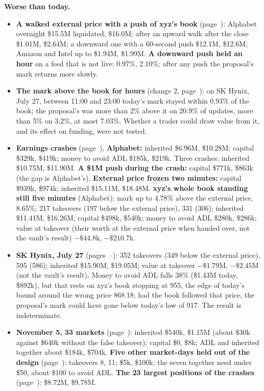 {\textbf{Worse than today.}
\begin{itemize}[leftmargin=1.3em,itemsep=0pt,topsep=0pt,parsep=0pt]
\item \textbf{A walked external price with a push of xyz's book} (page~\pageref{sec:attacks}): Alphabet overnight \$15.5M liquidated, \$16.0M; after an upward walk after the close \$1.01M, \$2.64M; a downward one with a 60-second push \$12.1M, \$12.6M; Amazon and Intel up to \$1.94M, \$1.99M. \textbf{A downward push held an hour} on a feed that is not live: 0.97\%, 2.10\%; after any push the proposal's mark returns more slowly.
\item \textbf{The mark above the book for hours} (change 2, page~\pageref{sec:skhx}): on SK Hynix, July 27, between 11:00 and 23:00 today's mark stayed within 0.93\% of the book; the proposal's was more than 2\% above it on 20.9\% of updates, more than 5\% on 3.2\%, at most 7.03\%. Whether a trader could draw value from it, and its effect on funding, were not tested.
\item \textbf{Earnings crashes} (page~\pageref{sec:res-mark}), \textbf{Alphabet:} inherited \$6.96M, \$10.28M; capital \$329k, \$419k; money to avoid ADL \$185k, \$219k. Three crashes: inherited \$10.75M, \$11.90M. \textbf{A \$1M push during the crash:} capital \$771k, \$863k (the gap is Alphabet's). \textbf{External price frozen two minutes:} capital \$939k, \$974k; inherited \$15.11M, \$18.48M. \textbf{xyz's whole book standing still five minutes} (Alphabet): mark up to 4.78\% above the external price, 8.65\%; 217 takeovers (197 below the external price), 331 (306); inherited \$11.41M, \$16.26M; capital \$498k, \$540k; money to avoid ADL \$280k, \$286k; value at takeover (their worth at the external price when handed over, not the vault's result) $-\$44.8$k, $-\$210.7$k.
\item \textbf{SK Hynix, July 27} (pages~\pageref{sec:skhx}--\pageref{sec:skhx2}): 352 takeovers (349 below the external price), 595 (586); inherited \$15.90M, \$19.05M; value at takeover $-\$1.79$M, $-\$2.45$M (not the vault's result). Money to avoid ADL falls 38\% (\$1.43M today, \$892k), but that rests on xyz's book stopping at 955, the edge of today's bound around the wrong price 868.18; had the book followed that price, the proposal's mark could have gone below today's low of 917. The result is indeterminate.
\item \textbf{November 5, 33 markets} (page~\pageref{sec:users}): inherited \$540k, \$1.15M (about \$30k against \$640k without the false takeover); capital \$0, \$8k; ADL and inherited together about \$184k, \$704k. \textbf{Five other market-days held out of the design} (page~\pageref{sec:res-mark}): takeovers 8, 11; \$5k, \$100k; the seven together need under \$50, about \$100 to avoid ADL. \textbf{The 23 largest positions of the crashes} (page~\pageref{sec:res-cut}): \$8.72M, \$9.78M.

\end{itemize}}
